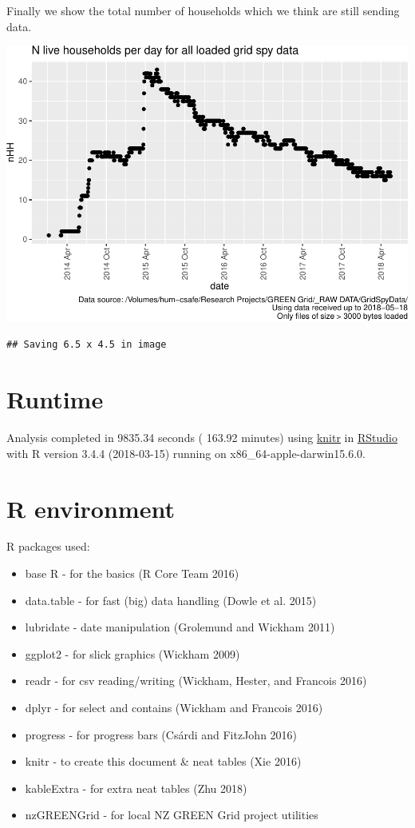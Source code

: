 \documentclass[]{article}
\providecommand{\tightlist}{%
  \setlength{\itemsep}{0pt}\setlength{\parskip}{0pt}}
\begin{document}
Finally we show the total number of households which we think are still
sending data.

\includegraphics{processNZGGElecCons1minData_files/figure-latex/liveDataHouseholds-1.pdf}

\begin{verbatim}
## Saving 6.5 x 4.5 in image
\end{verbatim}

\section{Runtime}\label{runtime}

Analysis completed in 9835.34 seconds ( 163.92 minutes) using
\href{https://cran.r-project.org/package=knitr}{knitr} in
\href{http://www.rstudio.com}{RStudio} with R version 3.4.4 (2018-03-15)
running on x86\_64-apple-darwin15.6.0.

\section{R environment}\label{r-environment}

R packages used:

\begin{itemize}
\tightlist
\item
  base R - for the basics (R Core Team 2016)
\item
  data.table - for fast (big) data handling (Dowle et al. 2015)
\item
  lubridate - date manipulation (Grolemund and Wickham 2011)
\item
  ggplot2 - for slick graphics (Wickham 2009)
\item
  readr - for csv reading/writing (Wickham, Hester, and Francois 2016)
\item
  dplyr - for select and contains (Wickham and Francois 2016)
\item
  progress - for progress bars (Csárdi and FitzJohn 2016)
\item
  knitr - to create this document \& neat tables (Xie 2016)
\item
  kableExtra - for extra neat tables (Zhu 2018)
\item
  nzGREENGrid - for local NZ GREEN Grid project utilities
\end{itemize}
\end{document}
